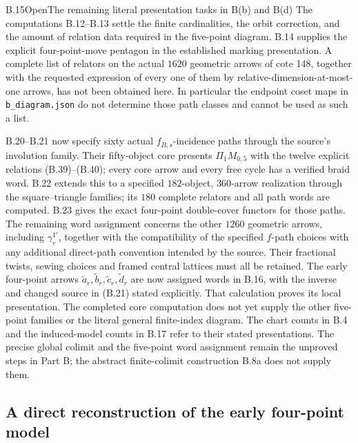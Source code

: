 \begin{result}{B.15}{Open}{The remaining literal presentation tasks in B(b) and B(d)}
The computations B.12--B.13 settle the finite cardinalities,
the orbit correction, and the amount of relation data required
in the five-point diagram.  B.14 supplies the explicit
four-point-move pentagon in the established marking presentation.
A complete list of relators on the actual $1620$ geometric arrows
of cote 148, together with the requested expression of every
one of them by relative-dimension-at-most-one arrows, has not
been obtained here.  In particular the endpoint coset maps in
\texttt{b\_diagram.json} do not determine those path classes and
cannot be used as such a list.

B.20--B.21 now specify sixty actual $f_{B,s}$-incidence paths
through the source's involution family.  Their fifty-object core
presents $\Pi_1M_{0,5}$ with the twelve explicit relations
(B.39)--(B.40); every core arrow and every free cycle has a
verified braid word.  B.22 extends this to a specified $182$-object, $360$-arrow
realization through the square--triangle families; its $180$
complete relators and all path words are computed.  B.23 gives
the exact four-point double-cover functors for those paths.
The remaining word assignment concerns the other $1260$
geometric arrows, including $\gamma_r^{1'}$, together with
the compatibility of the specified $f$-path choices with any
additional direct-path convention intended by the source.
Their fractional twists, sewing choices and framed central
lattices must all be retained.  The early four-point arrows
$\widetilde a_r,\widetilde b_r,\widetilde c_r,\widetilde d_r$
are now assigned words in B.16, with the inverse and changed source
in (B.21) stated explicitly.  That calculation proves its local
presentation.  The completed core computation does not yet supply
the other five-point families or the literal general finite-index
diagram.  The chart counts in
B.4 and the induced-model counts in B.17 refer to their stated
presentations.  The precise global colimit and the five-point word
assignment remain the unproved steps in Part B; the abstract
finite-colimit construction B.8a does not supply them.
\end{result}

\subsection{A direct reconstruction of the early four-point model}

